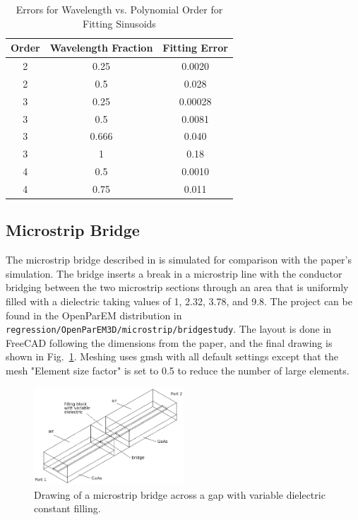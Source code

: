 \documentclass[titlepage]{article}
\renewcommand\_{\textunderscore\linebreak[1]}
\begin{document}
\begin{table}[H]
\caption{Errors for Wavelength vs. Polynomial Order for Fitting Sinusoids}
\begin{center}
\begin{tabular}{|c|c|c|}
\hline
Order & Wavelength Fraction & Fitting Error \\
\hline
2 & 0.25 & 0.0020 \\
2 & 0.5 & 0.028 \\
3 & 0.25 & 0.00028 \\
3 & 0.5 & 0.0081 \\
3 & 0.666 & 0.040 \\
3 & 1 & 0.18 \\
4 & 0.5 & 0.0010 \\
4 & 0.75 & 0.011 \\
\hline
\end{tabular}
\end{center}
\label{table:fitting_errors}
\end{table}
 

\subsection{Microstrip Bridge}

The microstrip bridge described in \cite{Wang} is simulated for comparison with the paper's simulation.  The bridge inserts a break in a microstrip line with the conductor bridging between the two microstrip sections through an area that is uniformly filled with a dielectric taking values of 1, 2.32, 3.78, and 9.8.  The project can be found in the OpenParEM distribution in \texttt{regression/OpenParEM3D/microstrip/bridge\_study}.  The layout is done in FreeCAD following the dimensions from the paper, and the final drawing is shown in Fig.~\ref{fig:bridge_drawing}.  Meshing uses gmsh with all default settings except that the mesh "Element size factor" is set to 0.5 to reduce the number of large elements.

\begin{figure}[H]
  \centering
  \includegraphics[width=0.5\textwidth]{../regression/OpenParEM3D/microstrip/bridge_study/screenshots/bridge_drawing}
  \caption{Drawing of a microstrip bridge across a gap with variable dielectric constant filling.}
  \label{fig:bridge_drawing}
\end{figure}
\end{document}

